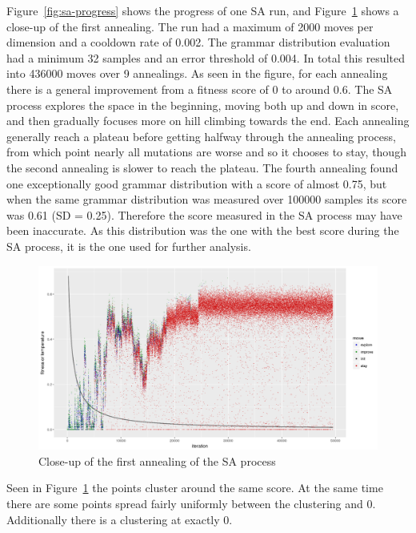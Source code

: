 Figure~\ref{fig:sa-progress} shows the progress of one \gls{SA} run, and Figure~\ref{fig:sa-progress-close} shows a close-up of the first annealing.
The run had a maximum of 2000 moves per dimension and a cooldown rate of 0.002.
The grammar distribution evaluation had a minimum 32 samples and an error threshold of 0.004.
In total this resulted into 436000 moves over 9 annealings.
As seen in the figure, for each annealing there is a general improvement from a fitness score of 0 to around 0.6.
The \gls{SA} process explores the space in the beginning, moving both up and down in score, and then gradually focuses more on hill climbing towards the end.
Each annealing generally reach a plateau before getting halfway through the annealing process, from which point nearly all mutations are worse and so it chooses to stay, though the second annealing is slower to reach the plateau.
The fourth annealing found one exceptionally good grammar distribution with a score of almost 0.75, but when the same grammar distribution was measured over 100000 samples its score was 0.61 (SD = 0.25).
Therefore the score measured in the \gls{SA} process may have been inaccurate.
As this distribution was the one with the best score during the \gls{SA} process, it is the one used for further analysis.

\begin{figure}
    \includegraphics[width=\textwidth]{figures/sa-progress-close}
    \caption[Close-up of the first annealing of the SA process]{Close-up of the first annealing of the \gls{SA} process}
    \label{fig:sa-progress-close}
\end{figure}

Seen in Figure~\ref{fig:sa-progress-close} the points cluster around the same score.
At the same time there are some points spread fairly uniformly between the clustering and 0.
Additionally there is a clustering at exactly 0.

